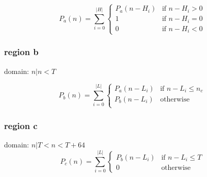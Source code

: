 \documentclass[a4paper, 11pt]{article}
\begin{document}
\[
	P_a(n) = \sum_{i=0}^{\vert H \vert}
		\begin{cases}
			P_a(n - H_i)	& \text{if $n - H_i > 0$} \\
			1		& \text{if $n - H_i = 0$} \\
			0		& \text{if $n - H_i < 0$}
		 \end{cases}
\]

\subsubsection{region b}
domain: $n \vert n < T$

\[
	P_b(n) = \sum_{i=0}^{\vert L \vert}
		\begin{cases}
			P_a(n - L_i)	& \text{if $n - L_i \leq n_c$} \\
			P_b(n - L_i)	& \text{otherwise} \\
		 \end{cases}
\]

\subsubsection{region c}
domain: $n \vert T < n < T + 64$
\[
	P_c(n) = \sum_{i=0}^{\vert L \vert}
		\begin{cases}
			P_b(n - L_i)	& \text{if $n - L_i \leq T$} \\
			0		& \text{otherwise}
			
		 \end{cases}
\]
\end{document}
